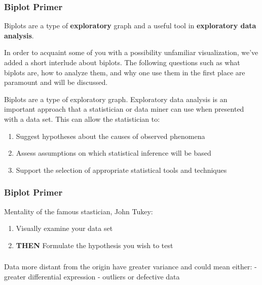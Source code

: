 \documentclass[serif ]{beamer}
\begin{document}
	\begin{frame}
		\frametitle{Biplot Primer}

		Biplots are a type of {\bf exploratory} graph and a useful tool in {\bf exploratory data analysis}.

	\note
	{
		In order to acquaint some of you with a possibility unfamiliar visualization, we've added a short interlude 
		about  biplots. The following questions such as what biplots are, how to analyze them, and why one
		use them in the first place are paramount and will be discussed.\newline
		
		Biplots are a type of exploratory graph. Exploratory data analysis is an important approach
		that a statistician or data miner can use when presented with a data set. This can allow the
		statistician to:

		\begin{enumerate}
			\item Suggest hypotheses about the causes of observed phenomena
			\item Assess assumptions on which statistical inference will be based
			\item Support the selection of appropriate statistical tools and techniques
		\end{enumerate}


	}
	\end{frame}

%
%
%
%

	\begin{frame}
		\frametitle{Biplot Primer}
		Mentality of the famous stastician, John Tukey:
	
		\begin{enumerate}
			\item Visually examine your data set 
			\item {\bf THEN } Formulate the hypothesis you wish to test
		\end{enumerate}
	\end{frame}

	\begin{frame}
		\frametitle{}
		
		Data more distant from the origin have greater variance and could mean either:
		- greater differential expression
		- outliers or defective data
	
	\end{frame}
\end{document}
